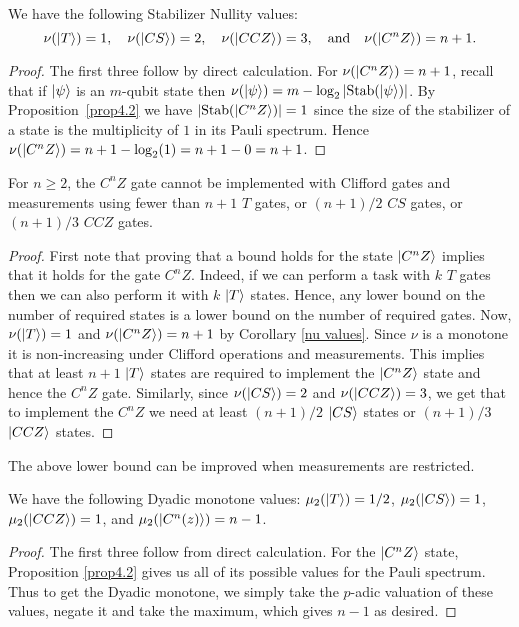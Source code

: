 \documentclass[12pt]{dalthesis}
\begin{document}
\begin{corollary}
\label{nu values}
We have the following Stabilizer Nullity values: 
\[
\nu (\ket{T}) = 1, \quad \nu (\ket{CS}) = 2, \quad \nu (\ket{CCZ}) = 3, \quad \mbox{and} \quad \nu (\ket{C^n Z}) = n+1.
\]
\end{corollary}
\begin{proof}

The first three follow by direct calculation. For $\nu (\ket{C^n Z}) =
n+1$, recall that if $\ket{\psi}$ is an $m$-qubit state then $\nu
(\ket{\psi}) = m - \log_2|\mathrm{Stab}(\ket{\psi})|$. By
Proposition~\ref{prop4.2} we have $|\mathrm{Stab}(\ket{C^n Z})| = 1$ since the
size of the stabilizer of a state is the multiplicity of $1$ in its
Pauli spectrum. Hence $\nu (\ket{C^n Z}) = n+1 - \log_2 (1) = n+1-0 =
n+1$.
\end{proof}

\begin{proposition}
\label{nullity(C^nZ) LB}
For $n \geq 2$, the $C^n Z$ gate cannot be implemented with Clifford gates and measurements using fewer than $n+1$ $T$ gates, or $(n+1)/2$ $CS$ gates, or $(n+1)/3$ $CCZ$ gates.
\end{proposition}

\begin{proof}
First note that proving that a bound holds for the state $\ket{C^n Z}$ implies that it holds for the gate $C^n Z$. Indeed, if we can perform a task with $k$ $T$ gates then we can also perform it with $k$ $\ket{T}$ states. Hence, any lower bound on the number of required states is a lower bound on the number of required gates. Now, $\nu (\ket{T}) = 1$ and $\nu (\ket{C^n Z}) = n+1$ by Corollary \ref{nu values}. Since $\nu$ is a monotone it is non-increasing under Clifford operations and measurements. This implies that at least $n+1$ $\ket{T}$ states are required to implement the $\ket{C^n Z}$ state and hence the $C^n Z$ gate. Similarly, since $\nu (\ket{CS}) = 2$ and $\nu (\ket{CCZ}) = 3$, we get that to implement the $C^n Z$ we need at least $(n+1)/2$ $\ket{CS}$ states or $(n+1)/3$ $\ket{CCZ}$ states.
\end{proof}

The above lower bound can be improved when measurements are restricted.

\begin{corollary}
\label{dyadic values}
We have the following Dyadic monotone values: $\mu_2 (\ket{T}) = 1/2$, $\mu_2 (\ket{CS}) = 1$, $\mu_2 (\ket{CCZ}) = 1$, and $\mu_2 (\ket{C^n(z)}) = n-1$.
\end{corollary}
\begin{proof}
The first three follow from direct calculation. For the $\ket{C^nZ}$ state, Proposition \ref{prop4.2} gives us all of its possible values for the Pauli spectrum. Thus to get the Dyadic monotone, we simply take the $p$-adic valuation of these values, negate it and take the maximum, which gives $n-1$ as desired.
\end{proof}
\end{document}
